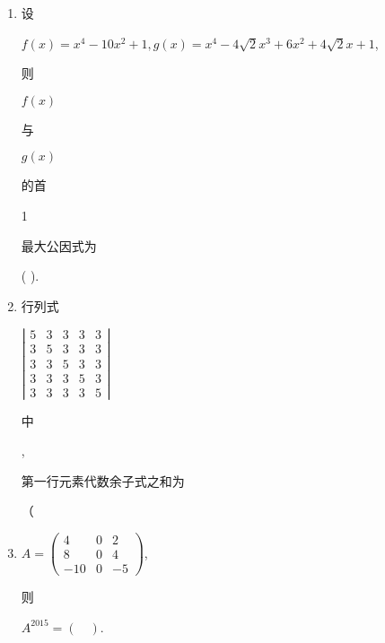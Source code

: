 \documentclass[10pt]{article}
\begin{document}
\begin{enumerate}
  \item \begin{CJK}{UTF8}{mj}设\end{CJK} $f(x)=x^{4}-10 x^{2}+1, g(x)=x^{4}-4 \sqrt{2} x^{3}+6 x^{2}+4 \sqrt{2} x+1$, \begin{CJK}{UTF8}{mj}则\end{CJK} $f(x)$ \begin{CJK}{UTF8}{mj}与\end{CJK} $g(x)$ \begin{CJK}{UTF8}{mj}的首\end{CJK} 1 \begin{CJK}{UTF8}{mj}最大公因式为\end{CJK} ( ).

  \item \begin{CJK}{UTF8}{mj}行列式\end{CJK} $\left|\begin{array}{lllll}5 & 3 & 3 & 3 & 3 \\ 3 & 5 & 3 & 3 & 3 \\ 3 & 3 & 5 & 3 & 3 \\ 3 & 3 & 3 & 5 & 3 \\ 3 & 3 & 3 & 3 & 5\end{array}\right|$ \begin{CJK}{UTF8}{mj}中\end{CJK},\begin{CJK}{UTF8}{mj}第一行元素代数余子式之和为\end{CJK}（

  \item $A=\left(\begin{array}{ccc}4 & 0 & 2 \\ 8 & 0 & 4 \\ -10 & 0 & -5\end{array}\right)$, \begin{CJK}{UTF8}{mj}则\end{CJK} $A^{2015}=(\quad)$.


\end{enumerate}
\end{document}
